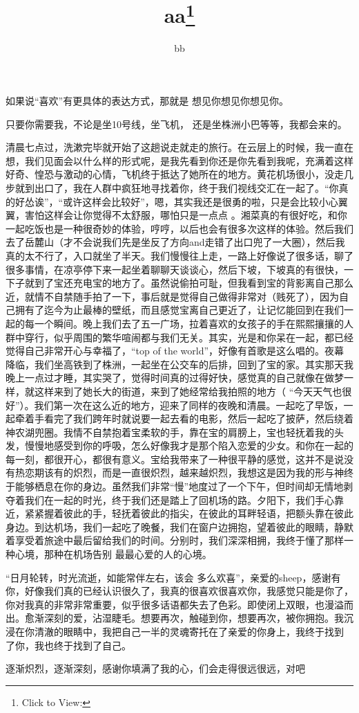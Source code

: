 \documentclass{article}
\title{aa\footnote{Click to View:\url{}}}
\author{bb}
\date{}
\begin{document}

\maketitle


\Large

如果说“喜欢”有更具体的表达方式，那就是
想见你想见你想见你。 

只要你需要我，不论是坐10号线，坐飞机，
还是坐株洲小巴等等，我都会来的。 

清晨七点过，洗漱完毕就开始了这趟说走就走的旅行。在云层上的时候，我一直在想，我们见面会以什么样的形式呢，是我先看到你还是你先看到我呢，充满着这样好奇、惶恐与激动的心情，飞机终于抵达了她所在的地方。黄花机场很小，没走几步就到出口了，我在人群中疯狂地寻找着你，终于我们视线交汇在一起了。“你真的好怂诶”，“或许这样会比较好”，嗯，其实我还是很勇的啦，只是会比较小心翼翼，害怕这样会让你觉得不太舒服，哪怕只是一点点
\newpage
。湘菜真的有很好吃，和你一起吃饭也是一种很奇妙的体验，哼哼，以后也会有很多次这样的体验。然后我们去了岳麓山（才不会说我们先是坐反了方向and走错了出口兜了一大圈），然后我真的太不行了，入口就坐了半天。我们慢慢往上走，一路上好像说了很多话，聊了很多事情，在凉亭停下来一起坐着聊聊天谈谈心，然后下坡，下坡真的有很快，一下子就到了宝还充电宝的地方了。虽然说偷拍可耻，但我看到宝的背影离自己那么近，就情不自禁随手拍了一下，事后就是觉得自己做得非常对（贱死了），因为自己拥有了迄今为止最棒的壁纸，而且感觉宝离自己更近了，让记忆能回到在我们一起的每一个瞬间。晚上我们去了五一广场，拉着喜欢的女孩子的手在熙熙攘攘的人群中穿行，似乎周围的繁华喧闹都与我们无关。其实，光是和你呆在一起，都已经觉得自己非常开心与幸福了，“top of the world”，好像有首歌是这么唱的。夜幕降临，我们坐高铁到了株洲，一起坐在公交车的后排，回到了宝的家。其实那天我晚上一点过才睡，其实哭了，觉得时间真的过得好快，感觉真的自己就像在做梦一样，就这样来到了她长大的街道，来到了她经常给我拍照的地方（
\newpage
“今天天气也很好”）。我们第一次在这么近的地方，迎来了同样的夜晚和清晨。一起吃了早饭，一起牵着手看完了我们跨年时就说要一起去看的电影，然后一起吃了披萨，然后绕着神农湖兜圈。我情不自禁抱着宝柔软的手，靠在宝的肩膀上，宝也轻抚着我的头发，慢慢地感受到你的呼吸，怎么好像我才是那个陷入恋爱的少女。和你在一起的每一刻，都很开心，都很有意义。宝给我带来了一种很平静的感觉，这并不是说没有热恋期该有的炽烈，而是一直很炽烈，越来越炽烈，我想这是因为我的形与神终于能够栖息在你的身边。虽然我们非常“慢”地度过了一个下午，但时间却无情地剥夺着我们在一起的时光，终于我们还是踏上了回机场的路。夕阳下，我们手心靠近，紧紧握着彼此的手，轻抚着彼此的指尖，在彼此的耳畔轻语，把额头靠在彼此身边。到达机场，我们一起吃了晚餐，我们在窗户边拥抱，望着彼此的眼睛，静默着享受着旅途中最后留给我们的时间。分别时，我们深深相拥，我终于懂了那样一种心境，那种在机场告别
最最心爱的人的心境。 

“日月轮转，时光流逝，如能常伴左右，该会
\newpage
多么欢喜”，亲爱的sheep，感谢有你，好像我们真的已经认识很久了，我真的很喜欢很喜欢你，我感觉只能是你了，你对我真的非常非常重要，似乎很多话语都失去了色彩。即使闭上双眼，也漫溢而出。愈渐深刻的爱，沾湿睫毛。想要再次，触碰到你，想要再次，被你拥抱。我沉浸在你清澈的眼睛中，我把自己一半的灵魂寄托在了亲爱的你身上，我终于找到
了你，我也终于找到了自己。 

逐渐炽烈，逐渐深刻，感谢你填满了我的心，们会走得很远很远，对吧
\end{document}
